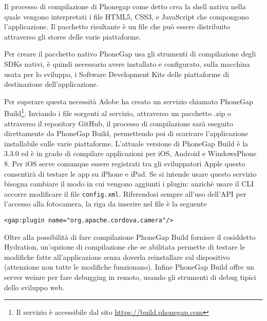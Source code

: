            Il processo di compilazione di Phonegap come detto
            crea la shell nativa nella quale vengono interpretati i file HTML5, CSS3, e
            JavaScript che compongono l'applicazione. Il pacchetto
            risultante è un file che può essere distribuito attraverso gli stores
            delle varie piattaforme.

            Per creare il pacchetto nativo PhoneGap usa gli strumenti di compilazione
            degli SDKs nativi, è quindi necessario avere installato e configurato,
            sulla macchina
            usata per lo sviluppo, i Software Development Kits delle piattaforme
            di destinazione dell'applicazione.

            Per superare questa necessità Adobe ha creato un servizio chiamato
            PhoneGap Build\footnote{Il servizio è accessibile dal sito
            \url{https://build.phonegap.com}}.
            Inviando i file sorgenti al servizio, attraverso un
            pacchetto .zip o attraverso il repository GitHub, il processo di
            compilazione sarà eseguito direttamente da PhoneGap Build, permettendo
            poi di scaricare l'applicazione installabile sulle varie piattaforme.
            L'attuale versione di PhoneGap Build è la 3.3.0 ed è in grado di compilare
            applicazioni per iOS, Android e WindowsPhone 8. Per iOS serve comunque
            essere registrati tra gli sviluppatori Apple questo consentirà di
            testare le app su iPhone e iPad.
            Se si intende usare questo servizio bisogna cambiare il modo in cui
            vengono aggiunti i plugin: anzichè usare il CLI occorre modificare
            il file \verb|config.xml|. Riferendosi sempre all'uso dell'API per
            l'accesso alla fotocamera, la riga da inserire nel file è la seguente
    \begin{lstlisting}[]
  <gap:plugin name="org.apache.cordova.camera"/>
    \end{lstlisting}

            Oltre alla possibilità di fare compilazione PhoneGap Build fornisce
            il cosiddetto Hydration, un'opzione di compilazione che se abilitata
            permette di testare le modifiche fatte all'applicazione senza doverla
            reinstallare sul dispositivo (attenzione non tutte le modifiche
            funzionano). Infine PhoneGap Build offre un server weinre per fare
            debugging in remoto, usando gli strumenti di debug tipici dello
            sviluppo web.

